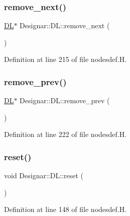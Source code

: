 \subsubsection{\texorpdfstring{remove\+\_\+next()}{remove\_next()}}
{\footnotesize\ttfamily \hyperlink{class_designar_1_1_d_l}{DL}$\ast$ Designar\+::\+D\+L\+::remove\+\_\+next (\begin{DoxyParamCaption}{ }\end{DoxyParamCaption})\hspace{0.3cm}{\ttfamily [inline]}}



Definition at line 215 of file nodesdef.\+H.

\mbox{\label{class_designar_1_1_d_l_ab1978cfd1b4a98bedb0da473a7ba3164}} 
\subsubsection{\texorpdfstring{remove\+\_\+prev()}{remove\_prev()}}
{\footnotesize\ttfamily \hyperlink{class_designar_1_1_d_l}{DL}$\ast$ Designar\+::\+D\+L\+::remove\+\_\+prev (\begin{DoxyParamCaption}{ }\end{DoxyParamCaption})\hspace{0.3cm}{\ttfamily [inline]}}



Definition at line 222 of file nodesdef.\+H.

\mbox{\label{class_designar_1_1_d_l_a859e63ccad5bfe211d1fd7396f871091}} 
\subsubsection{\texorpdfstring{reset()}{reset()}}
{\footnotesize\ttfamily void Designar\+::\+D\+L\+::reset (\begin{DoxyParamCaption}{ }\end{DoxyParamCaption})\hspace{0.3cm}{\ttfamily [inline]}}



Definition at line 148 of file nodesdef.\+H.

